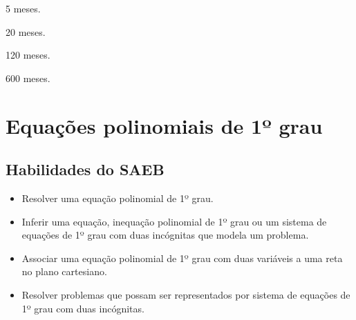 \begin{escolha}[itemsep=0pt]
\item 5 meses.
\item 20 meses.
\item 120 meses.
\item 600 meses.
\end{escolha}












\chapter{Equações polinomiais de 1º grau}

\section*{Habilidades do SAEB} 

\begin{itemize}
\item Resolver uma equação polinomial de 1º grau.
\item
  Inferir uma equação, inequação polinomial de 1º grau ou um sistema de
  equações de 1º grau com duas incógnitas que modela um problema.
\item
  Associar uma equação polinomial de 1º grau com duas variáveis a uma
  reta no plano cartesiano.
\item
  Resolver problemas que possam ser representados por sistema de
  equações de 1º grau com duas incógnitas.
\end{itemize}




